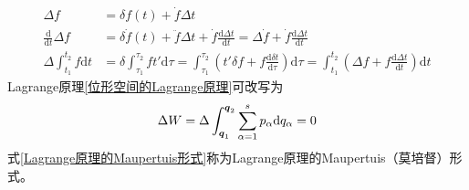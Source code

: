 \begin{align*}
	\Delta f & = \delta f(t) + \dot{f} \Delta t \\
	\frac{\mathrm{d}}{\mathrm{d} t} \Delta f & = \delta \dot{f}(t) + \ddot{f} \Delta t + \dot{f} \frac{\mathrm{d}\Delta t}{\mathrm{d} t} = \Delta \dot{f} + \dot{f} \frac{\mathrm{d}\Delta t}{\mathrm{d} t} \\
	\Delta \int_{t_1}^{t_2} f \mathrm{d} t & = \delta \int_{\tau_1}^{\tau_2} f t' \mathrm{d} \tau = \int_{\tau_1}^{\tau_2} \left(t' \delta f + f\frac{\mathrm{d} \delta t}{\mathrm{d} \tau}\right) \mathrm{d} \tau = \int_{t_1}^{t_2} \left(\Delta f + f\frac{\mathrm{d} \Delta t}{\mathrm{d} t}\right) \mathrm{d} t
\end{align*}
Lagrange原理\eqref{位形空间的Lagrange原理}可改写为
\begin{equation}
	\Delta W = \Delta \int_{\boldsymbol{q}_1}^{\boldsymbol{q}_2} \sum_{\alpha=1}^s p_\alpha \mathrm{d} q_\alpha = 0
	\label{Lagrange原理的Maupertuis形式}
\end{equation}
式\eqref{Lagrange原理的Maupertuis形式}称为{\heiti Lagrange原理的Maupertuis（莫培督）形式}。

